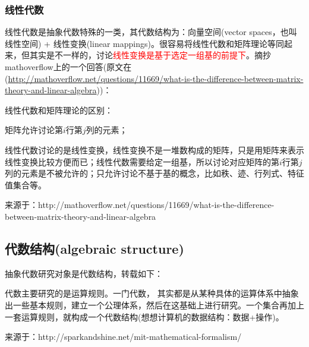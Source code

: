 \documentclass[12pt]{article}
\begin{document}
\subsubsection{线性代数}
线性代数是抽象代数特殊的一类，其代数结构为：向量空间(vector spaces，也叫线性空间) + 线性变换(linear mappings)。很容易将线性代数和矩阵理论等同起来，但其实是不一样的，讨论\textcolor{red}{线性变换是基于选定一组基的前提下}。摘抄mathoverflow上的一个回答(原文在(\url{http://mathoverflow.net/questions/11669/what-is-the-difference-between-matrix-theory-and-linear-algebra}))：

\begin{framed}
线性代数和矩阵理论的区别：

矩阵允许讨论第$i$行第$j$列的元素；

线性代数讨论的是线性变换，线性变换不是一堆数构成的矩阵，只是用矩阵来表示线性变换比较方便而已；线性代数需要给定一组基，所以讨论对应矩阵的第$i$行第$j$列的元素是不被允许的；只允许讨论不基于基的概念，比如秩、迹、行列式、特征值集合等。

来源于：http://mathoverflow.net/questions/11669/what-is-the-difference-between-matrix-theory-and-linear-algebra
\end{framed}

\subsection{代数结构(algebraic structure)}
抽象代数研究对象是代数结构，转载如下：

\begin{framed}
代数主要研究的是运算规则。一门代数， 其实都是从某种具体的运算体系中抽象出一些基本规则，建立一个公理体系，然后在这基础上进行研究。一个集合再加上一套运算规则，就构成一个代数结构(想想计算机的数据结构：数据+操作)。

来源于：http://sparkandshine.net/mit-mathematical-formalism/
\end{framed}
\end{document}
